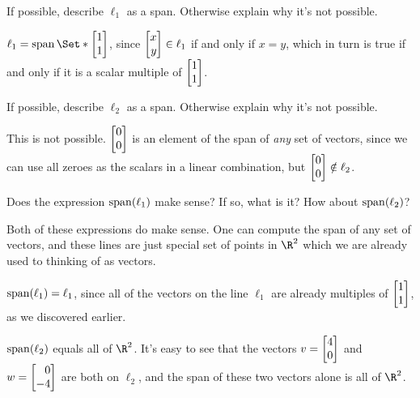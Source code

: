 	\begin{parts}
		\item If possible, describe $\ell_1$ as a span. Otherwise explain why
			it's not possible.
			\begin{solution}
				$\ell_1 = \Span\Set*{\mat{1\\1}}$, since $\mat{x\\y} \in \ell_1$
				if and only if $x = y$, which in turn is true if and only if it
				is a scalar multiple of $\mat{1\\1}$.
			\end{solution}
		\item If possible, describe $\ell_2$ as a span. Otherwise explain why it's
			not possible.
			\label{linesAsSpans.2}
			\begin{solution}
				This is not possible. $\mat{0\\0}$ is an element of	the span of
				\emph{any} set of vectors, since we can use all zeroes as the
				scalars in a linear combination, but $\mat{0\\0} \notin \ell_2$.
			\end{solution}
		\item Does the expression $\operatorname{span}(\ell_1)$ make sense? If so, what is it?
			How about $\operatorname{span}(\ell_2)$?
			\begin{solution}
				Both of these expressions do make sense. One can compute the span
				of any set of vectors, and these lines are just special set of
				points in $\R^2$ which we are already used to thinking of as vectors.

				$\operatorname{span}(\ell_1) = \ell_1$, since all of the vectors on
				the line $\ell_1$ are already multiples of $\mat{1\\1}$, as we
				discovered earlier.

				$\operatorname{span}(\ell_2)$ equals all of $\R^2$. It's easy to see that the
				vectors $v = \mat{4\\0}$ and $w = \mat{0\\-4}$ are both on $\ell_2$,
				and the span of these two vectors alone is all of $\R^2$.
			\end{solution}
	\end{parts}


	\bookonlynewpage


